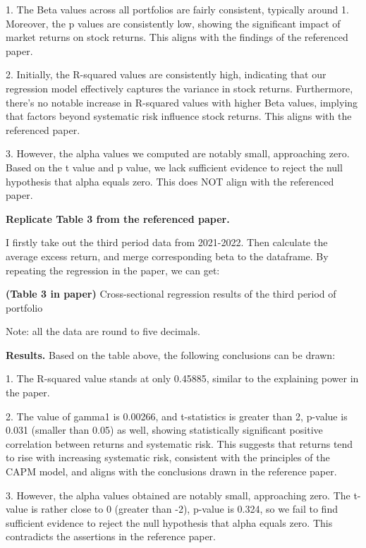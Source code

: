 1. The Beta values across all portfolios are fairly consistent, typically  around 1. Moreover, the p values are consistently low, showing the significant impact of market returns on stock returns. This aligns with the findings of the referenced paper.

2. Initially, the R-squared values are consistently high, indicating that our regression model effectively captures the variance in stock returns. Furthermore, there's no notable increase in R-squared values with higher Beta values, implying that factors beyond systematic risk influence stock returns. This aligns with the referenced paper.

3. However, the alpha values we computed are notably small, approaching zero. Based on the t value and p value, we lack sufficient evidence to reject the null hypothesis that alpha equals zero. This does NOT align with the referenced paper.


\noindent
\textbf{Replicate Table 3 from the referenced paper.}

I firstly take out the third period data from 2021-2022. Then calculate the average excess return, and merge corresponding beta to the dataframe. By repeating the regression in the paper, we can get:

\begin{table}[htbp]
    \centering
    \caption{\textbf{(Table 3 in paper)} Cross-sectional regression results of the third period of portfolio}
    \vspace{0.4cm}
\end{table}

Note: all the data are round to five decimals.


\noindent
\textbf{Results.} Based on the table above, the following conclusions can be drawn:

1. The R-squared value stands at only 0.45885, similar to the explaining power in the paper.

2. The value of gamma1 is 0.00266, and t-statistics is greater than 2, p-value is 0.031 (smaller than 0.05) as well, showing statistically significant positive correlation between returns and systematic risk. This suggests that returns tend to rise with increasing systematic risk, consistent with the principles of the CAPM model, and aligns with the conclusions drawn in the reference paper.

3. However, the alpha values obtained are notably small, approaching zero. The t-value is rather close to 0 (greater than -2), p-value is 0.324, so we fail to find sufficient evidence to reject the null hypothesis that alpha equals zero. This contradicts the assertions in the reference paper. 

